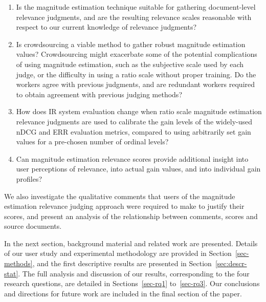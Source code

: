 \begin{enumerate}[RQ1.]
\itemsep 0em

\item \label{item:rq1} Is the magnitude estimation technique suitable
  for gathering document-level relevance judgments, and are the
  resulting relevance scales reasonable with respect to our current
  knowledge of relevance judgments?

\item \label{item:rq4} 
  Is crowdsourcing a viable method to gather robust magnitude
  estimation values?
  Crowdsourcing might exacerbate some of the
  potential complications of using magnitude estimation, such as the
  subjective scale used by each judge, or the difficulty in using a
  ratio scale without proper training.     
  Do the workers agree with
  previous judgments, and are 
  redundant workers required to obtain
  agreement with previous judging methods? 

\item \label{item:rq2} How does IR system evaluation change when ratio
  scale magnitude estimation relevance judgments are used to calibrate
  the gain levels of the widely-used nDCG and ERR evaluation metrics,
  compared to using arbitrarily set gain values for a pre-chosen
  number of ordinal levels?

\item \label{item:rq3} Can magnitude estimation relevance scores
  provide additional insight into user perceptions of relevance, into
  actual gain values, and into individual gain profiles?  

\end{enumerate}

We also investigate the qualitative comments that users of the magnitude
estimation relevance judging approach were required to make to justify
their scores, and present an analysis of the relationship between
comments, scores and source documents.

In the next section, background material and related work are
presented.
Details of our user study and experimental methodology are provided in
Section~\ref{sec-methods}, and the first descriptive results are
presented in Section~\ref{sec:descr-stat}.
The full analysis and discussion of our results, corresponding to the
four research questions, are detailed in Sections~\ref{sec-rq1}
to~\ref{sec-rq3}.
Our conclusions and directions for future work are included in the
final section of the paper.


